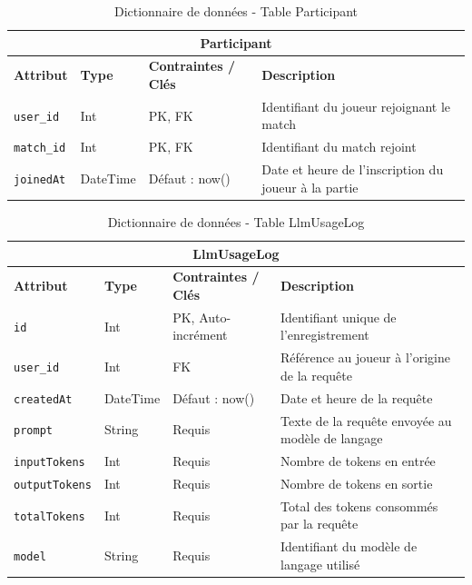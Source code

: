 \documentclass[12pt]{article}
\begin{document}
\vspace{0.5cm}
\begin{table}[H]
    \centering
    \begin{tabularx}{\textwidth}{|l|l|l|X|}
    \hline
    \multicolumn{4}{|c|}{\cellcolor[gray]{0.9} \textbf{Participant}} \\ \hline
    \textbf{Attribut} & \textbf{Type} & \textbf{Contraintes / Clés} & \textbf{Description} \\ \hline
    \texttt{user\_id} & Int & PK, FK & Identifiant du joueur rejoignant le match \\ \hline
    \texttt{match\_id} & Int & PK, FK & Identifiant du match rejoint \\ \hline
    \texttt{joinedAt} & DateTime & Défaut : now() & Date et heure de l'inscription du joueur à la partie \\ \hline
    \end{tabularx}
    \caption{Dictionnaire de données - Table Participant}
    \label{tab:dict_participant}
\end{table}

\vspace{0.5cm}
\begin{table}[H]
    \centering
    \begin{tabularx}{\textwidth}{|l|l|l|X|}
    \hline
    \multicolumn{4}{|c|}{\cellcolor[gray]{0.9} \textbf{LlmUsageLog}} \\ \hline
    \textbf{Attribut} & \textbf{Type} & \textbf{Contraintes / Clés} & \textbf{Description} \\ \hline
    \texttt{id} & Int & PK, Auto-incrément & Identifiant unique de l'enregistrement \\ \hline
    \texttt{user\_id} & Int & FK & Référence au joueur à l'origine de la requête \\ \hline
    \texttt{createdAt} & DateTime & Défaut : now() & Date et heure de la requête \\ \hline
    \texttt{prompt} & String & Requis & Texte de la requête envoyée au modèle de langage \\ \hline
    \texttt{inputTokens} & Int & Requis & Nombre de tokens en entrée \\ \hline
    \texttt{outputTokens} & Int & Requis & Nombre de tokens en sortie \\ \hline
    \texttt{totalTokens} & Int & Requis & Total des tokens consommés par la requête \\ \hline
    \texttt{model} & String & Requis & Identifiant du modèle de langage utilisé \\ \hline
    \end{tabularx}
    \caption{Dictionnaire de données - Table LlmUsageLog}
    \label{tab:dict_llm_usage}
\end{table}
\end{document}
